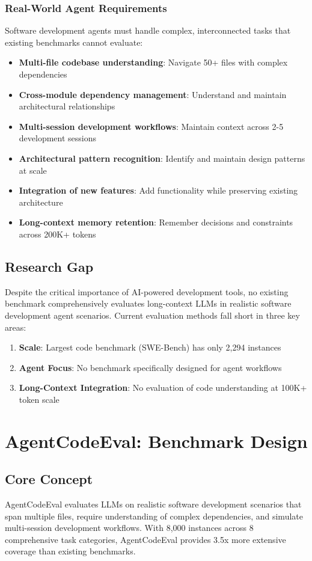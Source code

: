 \documentclass{article}
\begin{document}
\subsubsection{Real-World Agent Requirements}
Software development agents must handle complex, interconnected tasks that existing benchmarks cannot evaluate:
\begin{itemize}
    \item \textbf{Multi-file codebase understanding}: Navigate 50+ files with complex dependencies
    \item \textbf{Cross-module dependency management}: Understand and maintain architectural relationships
    \item \textbf{Multi-session development workflows}: Maintain context across 2-5 development sessions
    \item \textbf{Architectural pattern recognition}: Identify and maintain design patterns at scale
    \item \textbf{Integration of new features}: Add functionality while preserving existing architecture
    \item \textbf{Long-context memory retention}: Remember decisions and constraints across 200K+ tokens
\end{itemize}

\subsection{Research Gap}
Despite the critical importance of AI-powered development tools, no existing benchmark comprehensively evaluates long-context LLMs in realistic software development agent scenarios. Current evaluation methods fall short in three key areas:

\begin{enumerate}
    \item \textbf{Scale}: Largest code benchmark (SWE-Bench) has only 2,294 instances
    \item \textbf{Agent Focus}: No benchmark specifically designed for agent workflows
    \item \textbf{Long-Context Integration}: No evaluation of code understanding at 100K+ token scale
\end{enumerate}

\section{AgentCodeEval: Benchmark Design}

\subsection{Core Concept}
AgentCodeEval evaluates LLMs on realistic software development scenarios that span multiple files, require understanding of complex dependencies, and simulate multi-session development workflows. With 8,000 instances across 8 comprehensive task categories, AgentCodeEval provides 3.5x more extensive coverage than existing benchmarks.
\end{document}
